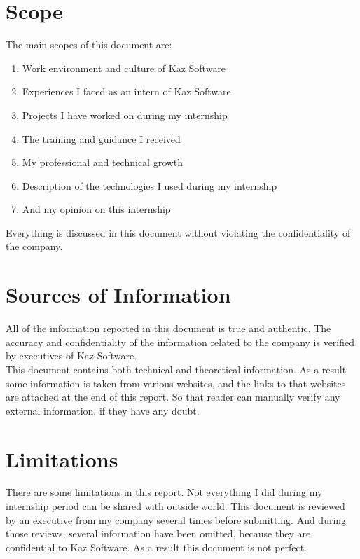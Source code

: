 \section{Scope}

The main scopes of this document are:

\begin{enumerate}
    \item Work environment and culture of Kaz Software
    \item Experiences I faced as an intern of Kaz Software
    \item Projects I have worked on during my internship
    \item The training and guidance I received
    \item My professional and technical growth
    \item Description of the technologies I used during my internship
    \item And my opinion on this internship
\end{enumerate}

Everything is discussed in this document without violating the confidentiality of the company.

\section{Sources of Information}

All of the information reported in this document is true and authentic.
The accuracy and confidentiality of the information related to the company is verified by executives of Kaz Software.\\

This document contains both technical and theoretical information.
As a result some information is taken from various websites, and the links to that websites are attached at the end of this report.
So that reader can manually verify any external information, if they have any doubt.

\section{Limitations}

There are some limitations in this report.
Not everything I did during my internship period can be shared with outside world.
This document is reviewed by an executive from my company several times before submitting.
And during those reviews, several information have been omitted, because they are confidential to Kaz Software.
As a result this document is not perfect.